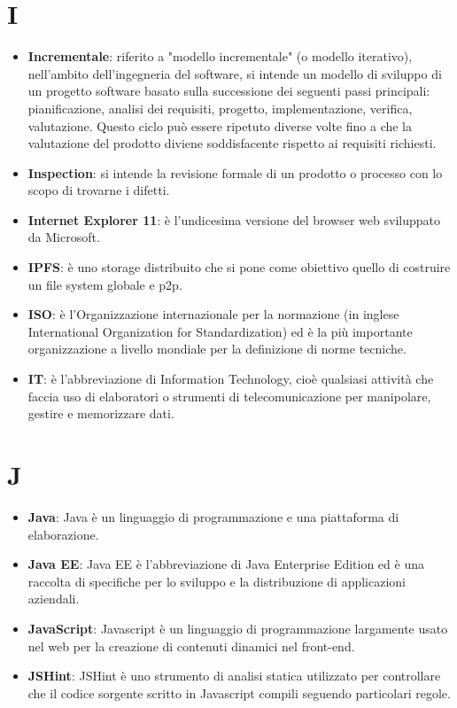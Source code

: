 \documentclass[a4paper, oneside, openany, dvipsnames, table]{article}
\begin{document}
\section{I}
\begin{itemize}
\item \textbf{Incrementale}: riferito a "modello incrementale" (o modello iterativo), nell'ambito dell'ingegneria del software, si intende un modello di sviluppo di un progetto software basato sulla successione dei seguenti passi principali: pianificazione, analisi dei requisiti, progetto, implementazione, verifica, valutazione. Questo ciclo può essere ripetuto diverse volte fino a che la valutazione del prodotto diviene soddisfacente rispetto ai requisiti richiesti.
\item \textbf{Inspection}: si intende la revisione formale di un prodotto o processo con lo scopo di trovarne i difetti.
\item \textbf{Internet Explorer 11}: è l'undicesima versione del browser web sviluppato da Microsoft.
\item \textbf{IPFS}: è uno storage distribuito che si pone come obiettivo quello di costruire un file system globale e p2p.
\item \textbf{ISO}: è l'Organizzazione internazionale per la normazione (in inglese International Organization for Standardization) ed è la più importante organizzazione a livello mondiale per la definizione di norme tecniche.
\item \textbf{IT}: è l'abbreviazione di Information Technology, cioè qualsiasi attività che faccia uso di elaboratori o strumenti di telecomunicazione per manipolare, gestire e memorizzare dati.

\end{itemize}

\section{J}
\begin{itemize}
\item \textbf{Java}: Java è un linguaggio di programmazione e una piattaforma di elaborazione.
\item \textbf{Java EE}: Java EE è l'abbreviazione di Java Enterprise Edition ed è una raccolta di specifiche per lo sviluppo e la distribuzione di applicazioni aziendali.	
\item \textbf{JavaScript}: Javascript è un linguaggio di programmazione largamente usato nel web per la creazione di contenuti dinamici nel front-end. 
\item \textbf{JSHint}: JSHint è uno strumento di analisi statica utilizzato per controllare che il codice sorgente scritto in Javascript compili seguendo particolari regole.
\end{itemize}
\end{document}
